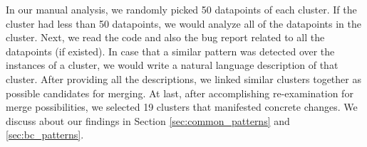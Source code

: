 In our manual analysis, we randomly picked 50 datapoints of each cluster. If the cluster had less than 50 datapoints, we would analyze all of the datapoints in the cluster. Next, we read the code and also the bug report related to all the datapoints (if existed). In case that a similar pattern was detected over the instances of a cluster, we would write a natural language description of that cluster. After providing all the descriptions, we linked similar clusters together as possible candidates for merging. At last, after accomplishing re-examination for merge possibilities, we selected 19 clusters that manifested concrete changes. We discuss about our findings in Section \ref{sec:common_patterns} and \ref{sec:bc_patterns}.




